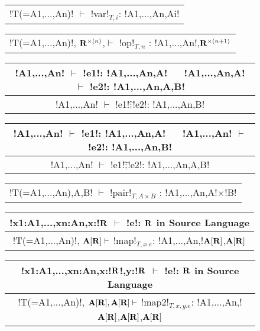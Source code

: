 \begin{figure*}[tb]
    \centering
    \begin{tabular}{c} 
    \\\hline
    !T(=A1,...,An)! $\vdash$ !var!$_{T,i}$: !A1,...,An,Ai!
    \end{tabular}
    \hspace{0.5cm}
    \begin{tabular}{c}
        \\\hline
        !T(=A1,...,An)!, $\mathbf{R}^{\times(n)}$,$\vdash$ !op!$_{T,n}$ : !A1,...,An!,$\mathbf{R}^{\times(n+1)}$
    \end{tabular}

    \begin{tabular}{c}
    !A1,...,An! $\vdash$ !e1!: !A1,...,An,A! $\quad$ !A1,...,An,A! $\vdash$ !e2!: !A1,...,An,A,B! \\\hline
    !A1,...,An! $\vdash$ !e1!$\widehat{;}$!e2!: !A1,...,An,B!
    \end{tabular}
    \hspace{0.5cm}
    \begin{tabular}{c}
        !A1,...,An! $\vdash$ !e1!: !A1,...,An,A! $\quad$ !A1,...,An! $\vdash$ !e2!: !A1,...,An,B! \\\hline
        !A1,...,An! $\vdash$ !e1!$\widetilde{;}$!e2!: !A1,...,An,A,B!
    \end{tabular}

    \begin{tabular}{c}
        \\\hline
        !T(=A1,...,An),A,B! $\vdash$ !pair!$_{T,A\times B}$ : !A1,...,An,A!$\times$!B!
    \end{tabular}

    \begin{tabular}{c}
        !x1:A1,...,xn:An,x:!$\mathbf{R}$ $\vdash$ !e!: $\mathbf{R}$ in Source Language
        \\\hline  
        !T(=A1,...,An)!, $\mathbf{A}[\mathbf{R}] \vdash$ !map!$_{T, x.e}$: !A1,...,An,!$\mathbf{A}[\mathbf{R}]$,$\mathbf{A}[\mathbf{R}]$
    \end{tabular}

    \begin{tabular}{c}
        !x1:A1,...,xn:An,x:!$\mathbf{R}$!,y:!$\mathbf{R}$ $\vdash$ !e!: $\mathbf{R}$ in Source Language
        \\\hline  
        !T(=A1,...,An)!, $\mathbf{A}[\mathbf{R}],\mathbf{A}[\mathbf{R}] \vdash$ !map2!$_{T, x,y.e}$: !A1,...,An,!$\mathbf{A}[\mathbf{R}]$,$\mathbf{A}[\mathbf{R}]$,$\mathbf{A}[\mathbf{R}]$
    \end{tabular}


\end{figure*}
